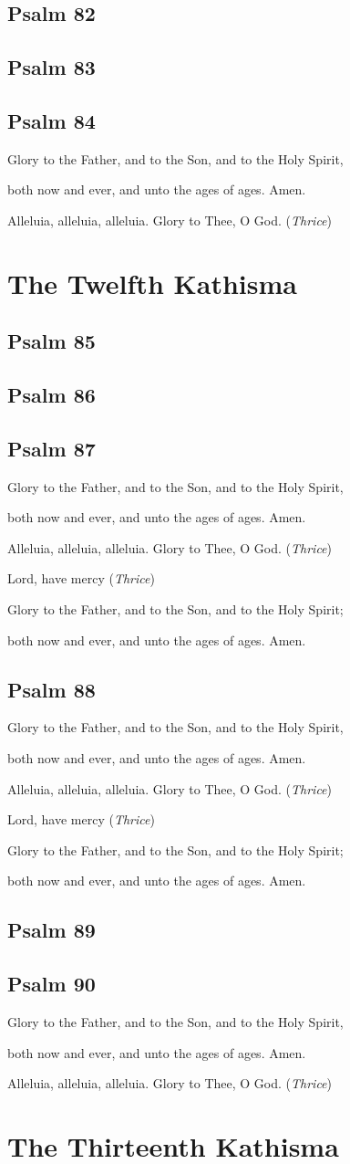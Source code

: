 \documentclass[12pt,openany]{book}
\newcommand{\kathismabreak}{
  \medskip
  \begin{center}
  \begin{footnotesize}
  Glory to the Father, and to the Son, and to the Holy Spirit,
  
  both now and ever, and unto the ages of ages. Amen.

  Alleluia, alleluia, alleluia. Glory to Thee, O God. (\textit{Thrice})

  Lord, have mercy (\textit{Thrice})

  Glory to the Father, and to the Son, and to the Holy Spirit;
  
  both now and ever, and unto the ages of ages. Amen.
  \end{footnotesize}
  \end{center}
  \smallbreak
}
\newcommand{\kathismaend}{
  \medskip
  \begin{center}
  \begin{footnotesize}
  Glory to the Father, and to the Son, and to the Holy Spirit,
  
  both now and ever, and unto the ages of ages. Amen.

  Alleluia, alleluia, alleluia. Glory to Thee, O God. (\textit{Thrice})
  \end{footnotesize}
  \end{center}
  \smallbreak
}
\begin{document}
\section{Psalm 82}

\smallskip
\section{Psalm 83}

\smallskip
\section{Psalm 84}


\pagebreak %
\kathismaend

\chapter*{The Twelfth Kathisma}
\smallskip
\section{Psalm 85}

\smallskip
\section{Psalm 86}

\smallskip
\section{Psalm 87}


\kathismabreak
\smallskip
\section{Psalm 88}


\kathismabreak
\smallskip
\section{Psalm 89}

\smallskip
\section{Psalm 90}


\kathismaend

\chapter*{The Thirteenth Kathisma}
\smallskip
\end{document}
